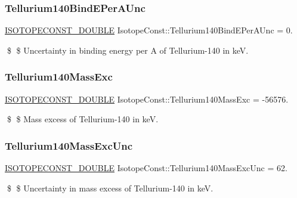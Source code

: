 \subsubsection{\texorpdfstring{Tellurium140\+Bind\+E\+Per\+A\+Unc}{Tellurium140BindEPerAUnc}}
{\footnotesize\ttfamily \mbox{\hyperlink{group___isotope_const-_macros_ga8f45a7272ce02c0b4c65c44636ed719a}{I\+S\+O\+T\+O\+P\+E\+C\+O\+N\+S\+T\+\_\+\+D\+O\+U\+B\+LE}} Isotope\+Const\+::\+Tellurium140\+Bind\+E\+Per\+A\+Unc = 0.}

\$ \$ Uncertainty in binding energy per A of Tellurium-\/140 in keV. \mbox{\label{group___isotope_const-_tellurium-_te140_gacace3606b4cc19d1533c025f5916d51f}} 
\subsubsection{\texorpdfstring{Tellurium140\+Mass\+Exc}{Tellurium140MassExc}}
{\footnotesize\ttfamily \mbox{\hyperlink{group___isotope_const-_macros_ga8f45a7272ce02c0b4c65c44636ed719a}{I\+S\+O\+T\+O\+P\+E\+C\+O\+N\+S\+T\+\_\+\+D\+O\+U\+B\+LE}} Isotope\+Const\+::\+Tellurium140\+Mass\+Exc = -\/56576.}

\$ \$ Mass excess of Tellurium-\/140 in keV. \mbox{\label{group___isotope_const-_tellurium-_te140_ga7091167ecafba9caa1a006f878cf8195}} 
\subsubsection{\texorpdfstring{Tellurium140\+Mass\+Exc\+Unc}{Tellurium140MassExcUnc}}
{\footnotesize\ttfamily \mbox{\hyperlink{group___isotope_const-_macros_ga8f45a7272ce02c0b4c65c44636ed719a}{I\+S\+O\+T\+O\+P\+E\+C\+O\+N\+S\+T\+\_\+\+D\+O\+U\+B\+LE}} Isotope\+Const\+::\+Tellurium140\+Mass\+Exc\+Unc = 62.}

\$ \$ Uncertainty in mass excess of Tellurium-\/140 in keV. \mbox{\label{group___isotope_const-_tellurium-_te140_ga83295c6e86a1f0af6ad2e9a9284c5c34}} 
